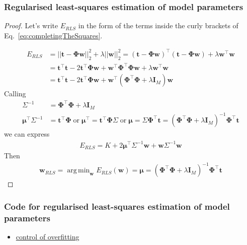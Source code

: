 \documentclass[11pt]{beamer}
\DeclareMathOperator*{\argmin}{arg\,min}
\begin{document}
\begin{frame}
    \frametitle{Regularised least-squares estimation of model parameters}
	\tiny
		\begin{proof}
			Let's write $E_{RLS}$ in the form of the terms inside the curly brackets of Eq.~\ref{eq:completingTheSquares}.

		\begin{align*}
			E_{RLS}&=||\mathbf{t}-\boldsymbol{\Phi}\mathbf{w}||_2^2+\lambda||\mathbf{w}||_2^2=(\mathbf{t}-\boldsymbol{\Phi}\mathbf{w})^\intercal(\mathbf{t}-\boldsymbol{\Phi}\mathbf{w})+\lambda\mathbf{w}^\intercal\mathbf{w}\\
                   &=\mathbf{t}^\intercal\mathbf{t}-2\mathbf{t}^\intercal\boldsymbol{\Phi}\mathbf{w}+\mathbf{w}^\intercal\boldsymbol{\Phi}^\intercal\boldsymbol{\Phi}\mathbf{w}+\lambda\mathbf{w}^\intercal\mathbf{w}\\
                   &=\mathbf{t}^\intercal\mathbf{t}-2\mathbf{t}^\intercal\boldsymbol{\Phi}\mathbf{w}+\mathbf{w}^\intercal(\boldsymbol{\Phi}^\intercal\boldsymbol{\Phi}+\lambda\mathbf{I}_M)\mathbf{w}
		\end{align*}
		Calling
		\begin{align*}
			\Sigma^{-1}&=\boldsymbol{\Phi}^\intercal\boldsymbol{\Phi}+\lambda\mathbf{I}_M\\
			\boldsymbol{\mu}^\intercal\Sigma^{-1}&=\mathbf{t}^\intercal\boldsymbol{\Phi}\;\text{or}\;\boldsymbol{\mu}^\intercal=\mathbf{t}^\intercal\boldsymbol{\Phi}\Sigma\;\text{or}\;\boldsymbol{\mu}=\Sigma\boldsymbol{\Phi}^\intercal\mathbf{t}=\left(\boldsymbol{\Phi}^\intercal\boldsymbol{\Phi}+\lambda\mathbf{I}_M\right)^{-1}\boldsymbol{\Phi}^\intercal\mathbf{t}
		\end{align*}
		we can express
		\begin{align*}
			E_{RLS}=K+2\boldsymbol{\mu}^\intercal\Sigma^{-1}\mathbf{w}+\mathbf{w}\Sigma^{-1}\mathbf{w}
		\end{align*}
		Then
		\begin{align*}
			 \mathbf{w}_{RLS}=\argmin_{\mathbf{w}}E_{RLS}(\mathbf{w})=\boldsymbol{\mu}=\left(\boldsymbol{\Phi}^\intercal\boldsymbol{\Phi}+\lambda\mathbf{I}_M\right)^{-1}\boldsymbol{\Phi}^\intercal\mathbf{t} 
		\end{align*}
		\end{proof}
	\normalsize
\end{frame}

\begin{frame}
    \frametitle{Code for regularised least-squares estimation of model parameters}
    \begin{itemize}
        \item \href{file:///nfs/ghome/live/rapela/dev/teaching/gcnuBridging2023/repo/docs/sphinx/build/html/auto\_examples/bayesianLinearRegression/plotRegularizedLeastSquares.html\#sphx-glr-auto-examples-bayesianlinearregression-plotregularizedleastsquares-py}{control of overfitting}
    \end{itemize}
\end{frame}
\end{document}
